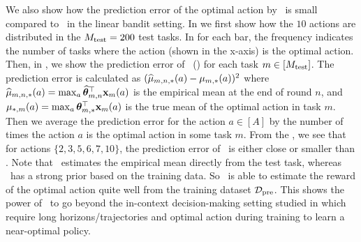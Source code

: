 We also show how the prediction error of the optimal action by \pred\ is small compared to \linucb\ in the linear bandit setting. In  we first show how the $10$ actions are distributed in the $M_{\text{test}}=200$ test tasks. In  for each bar, the frequency indicates the number of tasks where the action (shown in the x-axis) is the optimal action. Then, in , we show the prediction error of \pred\ (\gt) for each task $m\in[M_{\text{test}}]$. The prediction error is calculated as $(\widehat{\mu}_{m,n, *}(a) - \mu_{m, *}(a))^2$ where $\widehat{\mu}_{m,n, *}(a) = \max_a\widehat{\boldsymbol{\theta}}_{m,n}^\top\mathbf{x}_m(a)$ is the empirical mean at the end of round $n$, and $\mu_{*,m}(a)=\max_a\boldsymbol{\theta}_{m,*}^\top\mathbf{x}_m(a)$ is the true mean of the optimal action in task $m$. Then we average the prediction error for the action $a\in [A]$ by the number of times the action $a$ is the optimal action in some task $m$. 
%
From the , we see that for actions $\{2,3,5,6,7,10\}$, the prediction error of \pred\ is either close or smaller than \linucb. 
Note that \linucb\ estimates the empirical mean directly from the test task, whereas \pred\ has a strong prior based on the training data. So \pred\ is able to estimate the reward of the optimal action quite well from the training dataset $\mathcal{D}_{\text{pre}}$.
%
This shows the power of \pred\ to go beyond the in-context decision-making setting studied in \citet{lee2023supervised, lin2023transformers, ma2023rethinking, sinii2023context, liu2023reason} which require long horizons/trajectories and optimal action during training to learn a near-optimal policy. 

%


